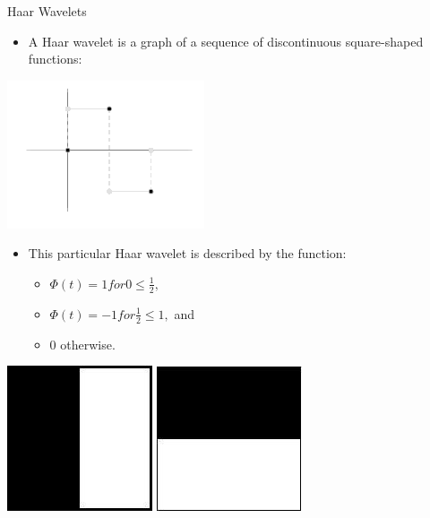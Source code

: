 \documentclass[xcolor=dvipsnames]{beamer}
\begin{document}
\begin{frame}[label=math-haar]{Haar Wavelets}
\begin{itemize}
 \item A Haar wavelet is a graph of a sequence of discontinuous square-shaped functions: 
\end{itemize} 
 \begin{center}
 \includegraphics[width=.3\textwidth]{imgs/haar-wavelet.png}
 \end{center}
\begin{itemize}
 \item This particular Haar wavelet is described by the function:
 \begin{itemize} 
 \item $\Phi(t) = 1 for 0 \leq \frac{1}{2},$
 \item $\Phi(t) = -1 for \frac{1}{2} \leq 1,$ and 
 \item $0$ otherwise.
 \end{itemize} 
\end{itemize} 
\end{frame}

\begin{frame}
 \begin{center}
 \includegraphics[width=.3\textwidth]{imgs/haar-x.jpg}
 \includegraphics[width=.3\textwidth]{imgs/haar-y.jpg}
 \end{center}
\end{frame}
\end{document}
